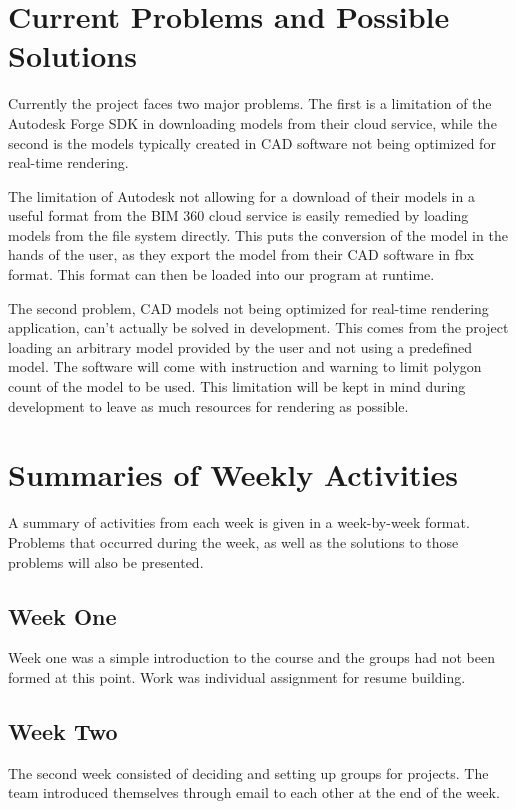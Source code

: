 \documentclass[onecolumn, draftclsnofoot,10pt, compsoc]{IEEEtran}
\begin{document}
\section{Current Problems and Possible Solutions}
Currently the project faces two major problems.
The first is a limitation of the Autodesk Forge SDK in downloading models from their cloud service, while the second is the models typically created in CAD software not being optimized for real-time rendering.\par
The limitation of Autodesk not allowing for a download of their models in a useful format from the BIM 360 cloud service is easily remedied by loading models from the file system directly.
This puts the conversion of the model in the hands of the user, as they export the model from their CAD software in fbx format.
This format can then be loaded into our program at runtime.\par
The second problem, CAD models not being optimized for real-time rendering application, can't actually be solved in development.
This comes from the project loading an arbitrary model provided by the user and not using a predefined model.
The software will come with instruction and warning to limit polygon count of the model to be used.
This limitation will be kept in mind during development to leave as much resources for rendering as possible.\par

\section{Summaries of Weekly Activities}
A summary of activities from each week is given in a week-by-week format. Problems that occurred during the week, as well as the solutions to those problems will also be presented.\par

\subsection{Week One}
Week one was a simple introduction to the course and the groups had not been formed at this point.
Work was individual assignment for resume building.\par

\subsection{Week Two}
The second week consisted of deciding and setting up groups for projects.
The team introduced themselves through email to each other at the end of the week.\par
\end{document}
